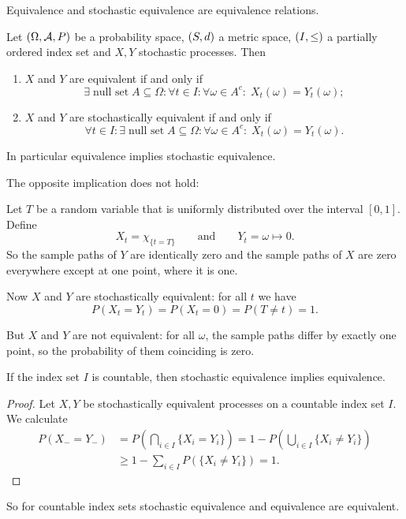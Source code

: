 \begin{lemma}
Equivalence and stochastic equivalence are equivalence relations.
\end{lemma}

\begin{lemma}
Let $\left( \Omega, \mathcal{A}, P \right)$ be a probability space, $\left( S,d \right)$ a metric space, $\left( I,\leq \right)$ a partially ordered index set and $X,Y$ stochastic processes. Then
\begin{enumerate}
\item $X$ and $Y$ are equivalent if and only if
\[ \exists \;\text{null set}\; A\subseteq \Omega: \forall t\in I: \forall \omega\in A^c: \; X_t(\omega) = Y_t(\omega); \]
\item $X$ and $Y$ are stochastically equivalent if and only if
\[ \forall t\in I: \exists \;\text{null set}\; A\subseteq \Omega: \forall \omega\in A^c: \; X_t(\omega) = Y_t(\omega).  \]
\end{enumerate}
In particular equivalence implies stochastic equivalence.
\end{lemma}
The opposite implication does not hold:
\begin{example}
Let $T$ be a random variable that is uniformly distributed over the interval $[0,1]$. Define
\[ X_t = \chi_{\{t=T\}} \qquad\text{and}\qquad Y_t = \omega\mapsto 0. \]
So the sample paths of $Y$ are identically zero and the sample paths of $X$ are zero everywhere except at one point, where it is one.

Now $X$ and $Y$ are stochastically equivalent: for all $t$ we have
\[  P(X_t = Y_t) = P(X_t = 0) = P(T \neq t) = 1. \]

But $X$ and $Y$ are not equivalent: for all $\omega$, the sample paths differ by exactly one point, so the probability of them coinciding is zero.
\end{example}

\begin{proposition}
If the index set $I$ is countable, then stochastic equivalence implies equivalence.
\end{proposition}
\begin{proof}
Let $X,Y$ be stochastically equivalent processes on a countable index set $I$. We calculate
\begin{align*}
P(X_- = Y_-) &= P\left(\bigcap_{i\in I}\{X_i = Y_i\}\right) = 1-P\left(\bigcup_{i\in I}\{X_i \neq Y_i\}\right) \\
&\geq 1 - \sum_{i\in I}P(\{X_i \neq Y_i\}) = 1.
\end{align*}
\end{proof}
So for countable index sets stochastic equivalence and equivalence are equivalent.

